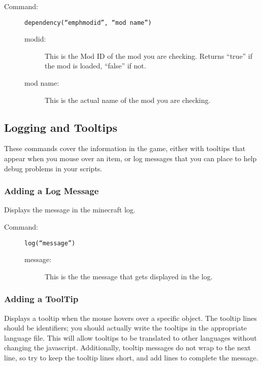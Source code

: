 \documentclass[letterpaper,titlepage,12pt]{article}
\begin{document}
\begin{description}
\item[Command:] \texttt{dependency(``emph{modid}'', ``\emph{mod name}'')}

\begin{description}
\item [modid:] This is the Mod ID of the mod you are checking.  Returns ``true'' if the mod is loaded, ``false'' if not.
\item [mod name:] This is the actual name of the mod you are checking.
\end{description}
\end{description}

\subsection{Logging and Tooltips}

These commands cover the information in the game, either with tooltips that appear when you mouse over an item, or log messages that you can place to help debug problems in your scripts.

\subsubsection{Adding a Log Message}

Displays the message in the minecraft log.

\begin{description}
\item[Command:] \texttt{log(``\emph{message}'')}

\begin{description}
\item [message:] This is the the message that gets displayed in the log.
\end{description}
\end{description}

\subsubsection{Adding a ToolTip}

Displays a tooltip when the mouse hovers over a specific object.  The tooltip lines should be identifiers; you should actually write the tooltips in the appropriate language file.  This will allow tooltips to be translated to other languages without changing the javascript.  Additionally, tooltip messages do not wrap to the next line, so try to keep the tooltip lines short, and add lines to complete the message.
\end{document}
